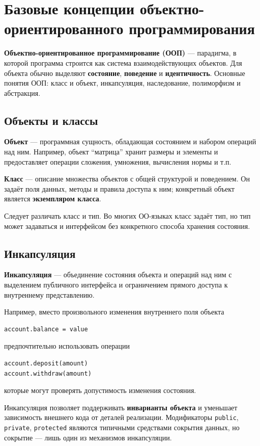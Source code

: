 \section{Базовые концепции объектно-ориентированного программирования}

\textbf{Объектно-ориентированное программирование (ООП)} --- парадигма, в которой программа строится как система взаимодействующих объектов. Для объекта обычно выделяют \textbf{состояние}, \textbf{поведение} и \textbf{идентичность}. Основные понятия ООП: класс и объект, инкапсуляция, наследование, полиморфизм и абстракция.

\subsection{Объекты и классы}

\textbf{Объект} --- программная сущность, обладающая состоянием и набором операций над ним. Например, объект ``матрица'' хранит размеры и элементы и предоставляет операции сложения, умножения, вычисления нормы и т.п.

\textbf{Класс} --- описание множества объектов с общей структурой и поведением. Он задаёт поля данных, методы и правила доступа к ним; конкретный объект является \textbf{экземпляром класса}.

Следует различать класс и тип. Во многих ОО-языках класс задаёт тип, но тип может задаваться и интерфейсом без конкретного способа хранения состояния.

\subsection{Инкапсуляция}

\textbf{Инкапсуляция} --- объединение состояния объекта и операций над ним с выделением публичного интерфейса и ограничением прямого доступа к внутреннему представлению.

Например, вместо произвольного изменения внутреннего поля объекта
\begin{verbatim}
account.balance = value
\end{verbatim}
предпочтительно использовать операции
\begin{verbatim}
account.deposit(amount)
account.withdraw(amount)
\end{verbatim}
которые могут проверять допустимость изменения состояния.

Инкапсуляция позволяет поддерживать \textbf{инварианты объекта} и уменьшает зависимость внешнего кода от деталей реализации. Модификаторы \texttt{public}, \texttt{private}, \texttt{protected} являются типичными средствами сокрытия данных, но сокрытие --- лишь один из механизмов инкапсуляции.

